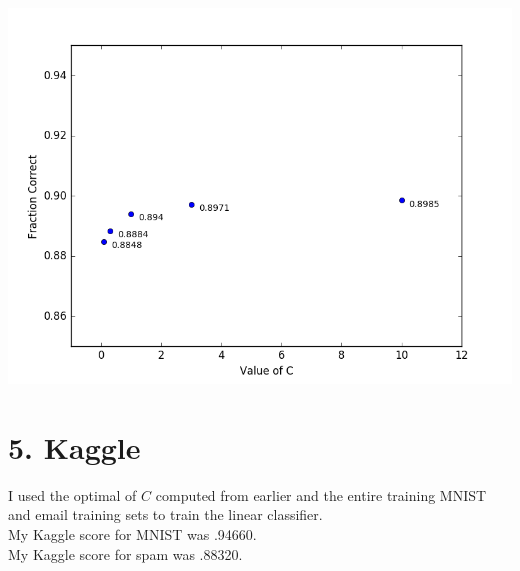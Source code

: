 \documentclass[11pt]{article}
\begin{document}
\includegraphics[scale=.7]{email_c_2.png}

\section*{5. Kaggle}
I used the optimal of $C$ computed from earlier and the entire training MNIST and email training sets to train the linear classifier.\\

My Kaggle score for MNIST was .94660.\\
My Kaggle score for spam was .88320.

\newpage
\end{document}
